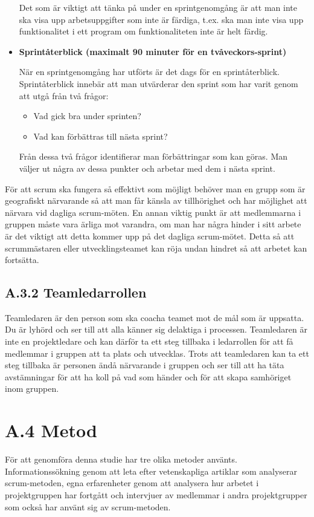 \begin{itemize}
Det som är viktigt att tänka på under en sprintgenomgång är att man inte ska visa upp arbetsuppgifter som inte är färdiga, t.ex. ska man inte visa upp funktionalitet i ett program om funktionaliteten inte är helt färdig.

\item \textbf{Sprintåterblick (maximalt 90 minuter för en tvåveckors-sprint)}

När en sprintgenomgång har utförts är det dags för en sprintåterblick. Sprintåterblick innebär att man utvärderar den sprint som har varit genom att utgå från två frågor:

\begin{itemize}
	\item Vad gick bra under sprinten?
	\item Vad kan förbättras till nästa sprint?
\end{itemize}

Från dessa två frågor identifierar man förbättringar som kan göras. Man väljer ut några av dessa punkter och arbetar med dem i nästa sprint.

\end{itemize}

För att scrum ska fungera så effektivt som möjligt behöver man en grupp som är geografiskt närvarande så att man får känsla av tillhörighet och har möjlighet att närvara vid dagliga scrum-möten. En annan viktig punkt är att medlemmarna i gruppen måste vara ärliga mot varandra, om man har några hinder i sitt arbete är det viktigt att detta kommer upp på det dagliga scrum-mötet. Detta så att scrummästaren eller utvecklingsteamet kan röja undan hindret så att arbetet kan fortsätta.\cite{scrum}

\subsection{A.3.2 Teamledarrollen}
Teamledaren är den person som ska coacha teamet mot de mål som är uppsatta. Du är lyhörd och ser till att alla känner sig delaktiga i processen. Teamledaren är inte en projektledare och kan därför ta ett steg tillbaka i ledarrollen för att få medlemmar i gruppen att ta plats och utvecklas.\cite{teamledare} Trots att teamledaren kan ta ett steg tillbaka är personen ändå närvarande i gruppen och ser till att ha täta avstämningar för att ha koll på vad som händer och för att skapa samhöriget inom gruppen.\cite{teamguide}

\section{A.4 Metod}
För att genomföra denna studie har tre olika metoder använts. Informationssökning genom att leta efter vetenskapliga artiklar som analyserar scrum-metoden, egna erfarenheter genom att analysera hur arbetet i projektgruppen har fortgått och intervjuer av medlemmar i andra projektgrupper som också har använt sig av scrum-metoden.

